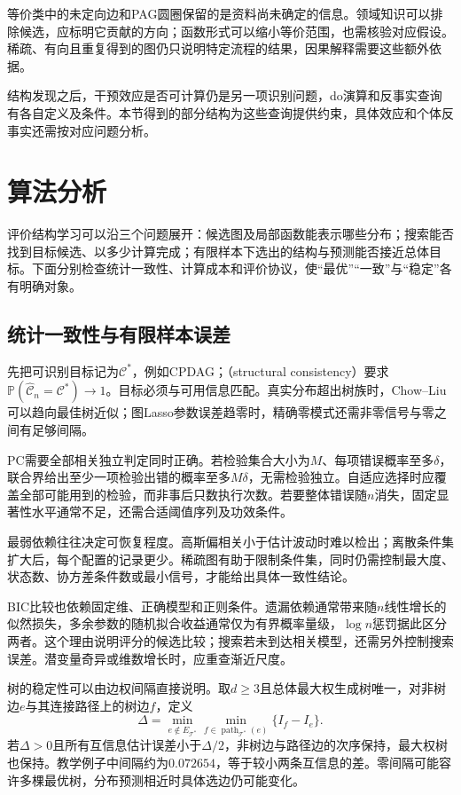 等价类中的未定向边和PAG圆圈保留的是资料尚未确定的信息。领域知识可以排除候选，应标明它贡献的方向；函数形式可以缩小等价范围，也需核验对应假设。稀疏、有向且重复得到的图仍只说明特定流程的结果，因果解释需要这些额外依据。

结构发现之后，干预效应是否可计算仍是另一项识别问题，do演算和反事实查询有各自定义及条件。本节得到的部分结构为这些查询提供约束，具体效应和个体反事实还需按对应问题分析。

\section{算法分析}
\label{sec:pgm-structure-learning-analysis}

评价结构学习可以沿三个问题展开：候选图及局部函数能表示哪些分布；搜索能否找到目标候选、以多少计算完成；有限样本下选出的结构与预测能否接近总体目标。下面分别检查统计一致性、计算成本和评价协议，使“最优”“一致”与“稳定”各有明确对象。

\subsection{统计一致性与有限样本误差}
\label{sec:pgm-structure-learning-consistency}

先把可识别目标记为$\mathcal{C}^{*}$，例如CPDAG；（structural consistency）要求$\mathbb{P}(\widehat{\mathcal{C}}_n=\mathcal{C}^{*})\to1$。目标必须与可用信息匹配。真实分布超出树族时，Chow--Liu可以趋向最佳树近似；图Lasso参数误差趋零时，精确零模式还需非零信号与零之间有足够间隔。

PC需要全部相关独立判定同时正确。若检验集合大小为$M$、每项错误概率至多$\delta$，联合界给出至少一项检验出错的概率至多$M\delta$，无需检验独立。自适应选择时应覆盖全部可能用到的检验，而非事后只数执行次数。若要整体错误随$n$消失，固定显著性水平通常不足，还需合适阈值序列及功效条件。

最弱依赖往往决定可恢复程度。高斯偏相关小于估计波动时难以检出；离散条件集扩大后，每个配置的记录更少。稀疏图有助于限制条件集，同时仍需控制最大度、状态数、协方差条件数或最小信号，才能给出具体一致性结论。

BIC比较也依赖固定维、正确模型和正则条件。遗漏依赖通常带来随$n$线性增长的似然损失，多余参数的随机拟合收益通常仅为有界概率量级，$\log n$惩罚据此区分两者。这个理由说明评分的候选比较；搜索若未到达相关模型，还需另外控制搜索误差。潜变量奇异或维数增长时，应重查渐近尺度。

树的稳定性可以由边权间隔直接说明。取$d\geq3$且总体最大权生成树唯一，对非树边$e$与其连接路径上的树边$f$，定义
\[
  \Delta=\min_{e\notin E_{\mathcal{T}^{*}}}
             \min_{f\in\operatorname{path}_{\mathcal{T}^{*}}(e)}
             \{I_f-I_e\}.
\]
若$\Delta>0$且所有互信息估计误差小于$\Delta/2$，非树边与路径边的次序保持，最大权树也保持。教学例子中间隔约为$0.072654$，等于较小两条互信息的差。零间隔可能容许多棵最优树，分布预测相近时具体选边仍可能变化。

